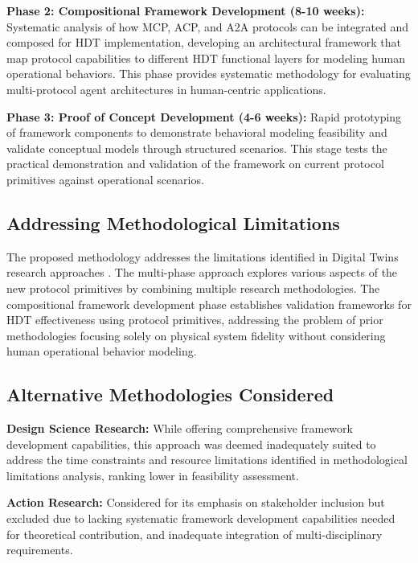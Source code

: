 \documentclass[12pt,a4paper]{article}
\begin{document}
\textbf{Phase 2: Compositional Framework Development (8-10 weeks):} Systematic analysis of how MCP, ACP, and A2A protocols can be integrated and composed for HDT implementation, developing an architectural framework that map protocol capabilities to different HDT functional layers for modeling human operational behaviors. This phase provides systematic methodology for evaluating multi-protocol agent architectures in human-centric applications.

\textbf{Phase 3: Proof of Concept Development (4-6 weeks):} Rapid prototyping of framework components to demonstrate behavioral modeling feasibility and validate conceptual models through structured scenarios. This stage tests the practical demonstration and validation of the framework on current protocol primitives against operational scenarios.

\subsection{Addressing Methodological Limitations}

The proposed methodology addresses the limitations identified in Digital Twins research approaches \cite{10.1186/s10033-024-00998-7} \cite{10.1016/j.ifacol.2022.09.675}. The multi-phase approach explores various aspects of the new protocol primitives by combining multiple research methodologies. The compositional framework development phase establishes validation frameworks for HDT effectiveness using protocol primitives, addressing the problem of prior methodologies focusing solely on physical system fidelity without considering human operational behavior modeling.

\subsection{Alternative Methodologies Considered}

\noindent \textbf{Design Science Research:} While offering comprehensive framework development capabilities, this approach was deemed inadequately suited to address the time constraints and resource limitations identified in methodological limitations analysis, ranking lower in feasibility assessment.

\noindent \textbf{Action Research:} Considered for its emphasis on stakeholder inclusion but excluded due to lacking systematic framework development capabilities needed for theoretical contribution, and inadequate integration of multi-disciplinary requirements.
\end{document}
